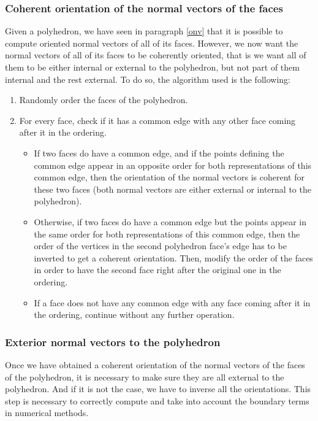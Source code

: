 \subsubsection{Coherent orientation of the normal vectors of the faces}
Given a polyhedron, we have seen in paragraph \ref{onv} that it is possible to compute oriented normal vectors of all of its faces. However, we now want the normal vectors of all of its faces to be coherently oriented, that is we want all of them to be either internal or external to the polyhedron, but not part of them internal and the rest external. To do so, the algorithm used is the following:
\begin{enumerate}
\item Randomly order the faces of the polyhedron. 
\item For every face, check if it has a common edge with any other face coming after it in the ordering.
\begin{itemize}
	\item If two faces do have a common edge, and if the points defining the common edge appear in an opposite order for both representations of this common edge, then the orientation of the normal vectors is coherent for these two faces (both normal vectors are either external or internal to the polyhedron). 
	\item Otherwise, if two faces do have a common edge but the points appear in the same order for both representations of this common edge, then the order of the vertices in the second polyhedron face's edge has to be inverted to get a coherent orientation. Then, modify the order of the faces in order to have the second face right after the original one in the ordering. 
	\item If a face does not have any common edge with any face coming after it in the ordering, continue without any further operation.
\end{itemize}
\end{enumerate}

\subsubsection{Exterior normal vectors to the polyhedron}
Once we have obtained a coherent orientation of the normal vectors of the faces of the polyhedron, it is necessary to make sure they are all external to the polyhedron. And if it is not the case, we have to inverse all the orientations. This step is necessary to correctly compute and take into account the boundary terms in numerical methods. 

